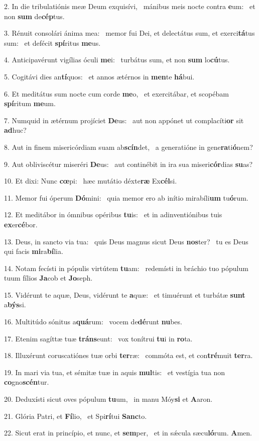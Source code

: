 2. In die tribulatiónis meæ Deum exquisívi, \dag\  mánibus meis nocte contra \textbf{e}um: \ast\  et non \textbf{sum} de\textbf{cép}tus.\

3. Rénuit consolári ánima mea: \dag\  memor fui Dei, et delectátus sum, et exerci\textbf{tá}tus sum: \ast\  et defécit \textbf{spí}ritus \textbf{me}us.\

4. Anticipavérunt vigílias óculi \textbf{me}i: \ast\  turbátus sum, et non \textbf{sum} lo\textbf{cú}tus.\

5. Cogitávi dies an\textbf{tí}quos: \ast\  et annos ætérnos in \textbf{men}te \textbf{há}bui.\

6. Et meditátus sum nocte cum corde \textbf{me}o, \ast\  et exercitábar, et scopébam \textbf{spí}ritum \textbf{me}um.\

7. Numquid in ætérnum projíciet \textbf{De}us: \ast\  aut non appónet ut complacíti\textbf{or} sit \textbf{ad}huc?\

8. Aut in finem misericórdiam suam ab\textbf{scín}det, \ast\  a generatióne in gene\textbf{ra}ti\textbf{ó}nem?\

9. Aut obliviscétur miseréri \textbf{De}us: \ast\  aut continébit in ira sua miseri\textbf{cór}dias \textbf{su}as?\

10. Et dixi: Nunc \textbf{cœ}pi: \ast\  hæc mutátio déxte\textbf{ræ} Ex\textbf{cél}si.\

11. Memor fui óperum \textbf{Dó}mini: \ast\  quia memor ero ab inítio mirabíli\textbf{um} tu\textbf{ó}rum.\

12. Et meditábor in ómnibus opéribus \textbf{tu}is: \ast\  et in adinventiónibus tuis \textbf{ex}er\textbf{cé}bor.\

13. Deus, in sancto via tua: \dag\  quis Deus magnus sicut Deus \textbf{nos}ter? \ast\  tu es Deus qui facis \textbf{mi}ra\textbf{bí}lia.\

14. Notam fecísti in pópulis virtútem \textbf{tu}am: \ast\  redemísti in bráchio tuo pópulum tuum fílios \textbf{Ja}cob et \textbf{Jo}seph.\

15. Vidérunt te aquæ, Deus, vidérunt te \textbf{a}quæ: \ast\  et timuérunt et turbátæ \textbf{sunt} a\textbf{býs}si.\

16. Multitúdo sónitus a\textbf{quá}rum: \ast\  vocem de\textbf{dé}runt \textbf{nu}bes.\

17. Etenim sagíttæ tuæ \textbf{tráns}eunt: \ast\  vox tonítrui \textbf{tu}i in \textbf{ro}ta.\

18. Illuxérunt coruscatiónes tuæ orbi \textbf{ter}ræ: \ast\  commóta est, et con\textbf{tré}muit \textbf{ter}ra.\

19. In mari via tua, et sémitæ tuæ in aquis \textbf{mul}tis: \ast\  et vestígia tua non \textbf{co}gno\textbf{scén}tur.\

20. Deduxísti sicut oves pópulum \textbf{tu}um, \ast\  in manu Móy\textbf{si} et \textbf{A}aron.\

21. Glória Patri, et \textbf{Fí}lio, \ast\  et Spi\textbf{rí}tui \textbf{Sanc}to.\

22. Sicut erat in princípio, et nunc, et \textbf{sem}per, \ast\  et in sǽcula sæcu\textbf{ló}rum. \textbf{A}men.\

